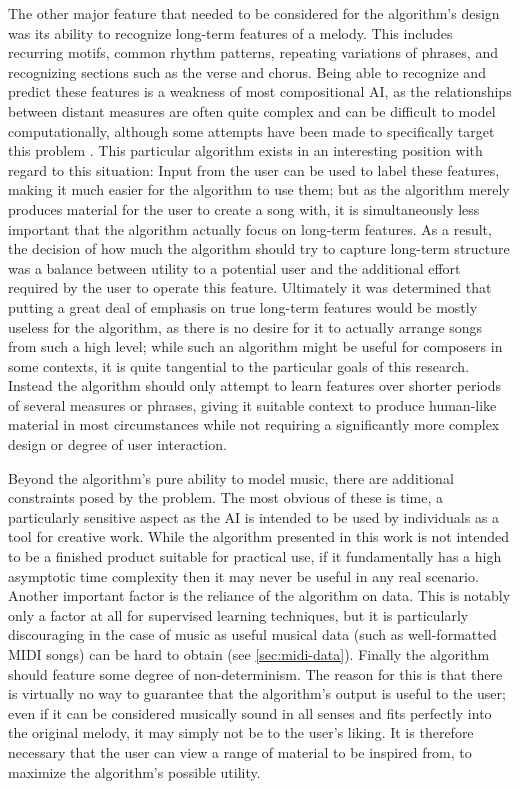 \documentclass[ author={Stephen Livermore-Tozer},
				supervisor={Dr. Peter Flach},
				degree={MEng},
				title={Algorithmic Co-composition Using Machine Learning},
				subtitle={},
				type={research},
				year={2016} ]{dissertation}
\begin{document}
	The other major feature that needed to be considered for the algorithm's design was its ability to recognize long-term features of a melody. This includes recurring motifs, common rhythm patterns, repeating variations of phrases, and recognizing sections such as the verse and chorus. Being able to recognize and predict these features is a weakness of most compositional AI, as the relationships between distant measures are often quite complex and can be difficult to model computationally, although some attempts have been made to specifically target this problem \cite{tokui2000music,paiement2007generative}. This particular algorithm exists in an interesting position with regard to this situation: Input from the user can be used to label these features, making it much easier for the algorithm to use them; but as the algorithm merely produces material for the user to create a song with, it is simultaneously less important that the algorithm actually focus on long-term features. As a result, the decision of how much the algorithm should try to capture long-term structure was a balance between utility to a potential user and the additional effort required by the user to operate this feature. Ultimately it was determined that putting a great deal of emphasis on true long-term features would be mostly useless for the algorithm, as there is no desire for it to actually arrange songs from such a high level; while such an algorithm might be useful for composers in some contexts, it is quite tangential to the particular goals of this research. Instead the algorithm should only attempt to learn features over shorter periods of several measures or phrases, giving it suitable context to produce human-like material in most circumstances while not requiring a significantly more complex design or degree of user interaction. 
	
	Beyond the algorithm's pure ability to model music, there are additional constraints posed by the problem. The most obvious of these is time, a particularly sensitive aspect as the AI is intended to be used by individuals as a tool for creative work. While the algorithm presented in this work is not intended to be a finished product suitable for practical use, if it fundamentally has a high asymptotic time complexity then it may never be useful in any real scenario. Another important factor is the reliance of the algorithm on data. This is notably only a factor at all for supervised learning techniques, but it is particularly discouraging in the case of music as useful musical data (such as well-formatted MIDI songs) can be hard to obtain (see \ref{sec:midi-data}). Finally the algorithm should feature some degree of non-determinism. The reason for this is that there is virtually no way to guarantee that the algorithm's output is useful to the user; even if it can be considered musically sound in all senses and fits perfectly into the original melody, it may simply not be to the user's liking. It is therefore necessary that the user can view a range of material to be inspired from, to maximize the algorithm's possible utility.
\end{document}
